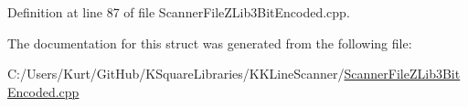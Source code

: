 Definition at line 87 of file Scanner\+File\+Z\+Lib3\+Bit\+Encoded.\+cpp.



The documentation for this struct was generated from the following file\+:\begin{DoxyCompactItemize}
\item 
C\+:/\+Users/\+Kurt/\+Git\+Hub/\+K\+Square\+Libraries/\+K\+K\+Line\+Scanner/\hyperlink{_scanner_file_z_lib3_bit_encoded_8cpp}{Scanner\+File\+Z\+Lib3\+Bit\+Encoded.\+cpp}\end{DoxyCompactItemize}
